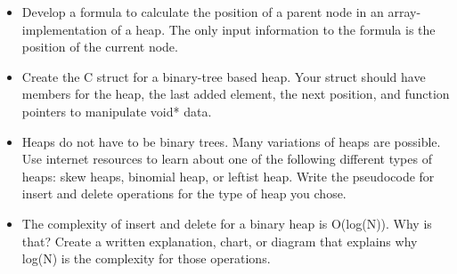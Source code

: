 \begin{itemize}
\item Develop a formula to calculate the position of a parent node in an array-implementation of a heap.  The only input information to the formula is the position of the current node.
\item Create the C struct for a binary-tree based heap.  Your struct should have members for the heap,  the last added element, the next position, and function pointers to manipulate void* data.
\item Heaps do not have to be binary trees.   Many variations of heaps are possible.   Use internet resources to learn about one of the following different types of heaps:  skew heaps, binomial heap, or leftist heap.   Write the pseudocode for insert and delete operations for the type of heap you chose.
\item The complexity of insert and delete for a binary heap is O(log(N)).   Why is that?  Create a written explanation, chart, or diagram that explains why log(N) is the complexity for those operations.

\end{itemize}